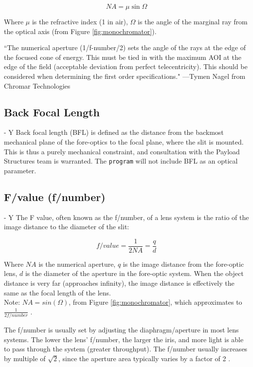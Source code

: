 \begin{equation}
    NA = \mu\sin\Omega
\end{equation}

Where $\mu$ is the refractive index (1 in air), $\Omega$ is the angle of the marginal ray from the optical axis (from Figure \ref{fig:monochromator}).

``The numerical aperture (1/f-number/2) sets the angle of the rays at the edge of the focused cone of energy. This must be tied in with the maximum AOI at the edge of the field (acceptable deviation from perfect telecentricity). This should be considered when determining the first order specifications." ---Tymen Nagel from Chromar Technologies

\subsection{Back Focal Length} - Y
Back focal length (BFL) is defined as the distance from the backmost mechanical plane of the fore-optics to the focal plane, where the slit is mounted. This is thus a purely mechanical constraint, and consultation with the Payload Structures team is warranted. The \texttt{program} will not include BFL as an optical parameter.

\subsection{F/value (f/number)} - Y
The F value, often known as the f/number, of a lens system is the ratio of the image distance to the diameter of the slit:

\begin{equation} \label{eq:f-num}
    f/value = \frac{1}{2NA} = \frac{q}{d}
\end{equation}

Where $NA$ is the numerical aperture, $q$ is the image distance from the fore-optic lens, $d$ is the diameter of the aperture in the fore-optic system. When the object distance is very far (approaches infinity), the image distance is effectively the same as the focal length of the lens.\\
Note: $NA = sin(\Omega)$, from Figure \ref{fig:monochromator}, which approximates to $\frac{1}{2f/number}$ \cite{Horiba_monochromator}.

The f/number is usually set by adjusting the diaphragm/aperture in most lens systems. The lower the lens’ f/number, the larger the iris, and more light is able to pass through the system (greater throughput). The f/number usually increases by multiple of $\sqrt{2}$, since the aperture area typically varies by a factor of 2 \cite{Hollows_undated}.

